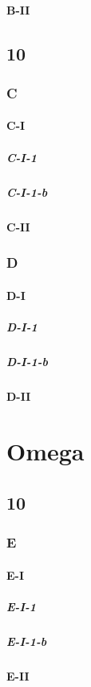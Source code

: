 \documentclass[12pt, a4paper, twoside, titlepage]{book}
\begin{document}
    \subsection{B-II}

\chapter{10}
\section{C}
    \subsection{C-I}
        \subsubsection{C-I-1}
        \subsubsection{C-I-1-b}
    \subsection{C-II}

\section{D}
    \subsection{D-I}
        \subsubsection{D-I-1}
        \subsubsection{D-I-1-b}
    \subsection{D-II}

\part{Omega}

\chapter{10}
\section{E}
    \subsection{E-I}
        \subsubsection{E-I-1}
        \subsubsection{E-I-1-b}
    \subsection{E-II}
\end{document}
